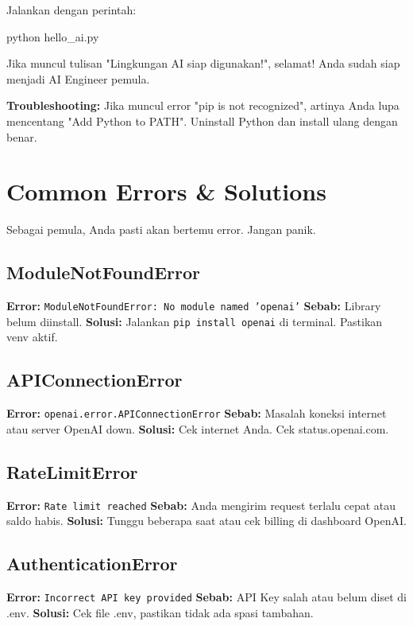 Jalankan dengan perintah:
\begin{codeblock}
python hello_ai.py
\end{codeblock}

Jika muncul tulisan "Lingkungan AI siap digunakan!", selamat! Anda sudah siap menjadi AI Engineer pemula.

\begin{exercisebox}
\textbf{Troubleshooting:}
Jika muncul error "pip is not recognized", artinya Anda lupa mencentang "Add Python to PATH". Uninstall Python dan install ulang dengan benar.
\end{exercisebox}

\section{Common Errors \& Solutions}

Sebagai pemula, Anda pasti akan bertemu error. Jangan panik.

\subsection{ModuleNotFoundError}
\textbf{Error:} \texttt{ModuleNotFoundError: No module named 'openai'}
\textbf{Sebab:} Library belum diinstall.
\textbf{Solusi:} Jalankan \texttt{pip install openai} di terminal. Pastikan venv aktif.

\subsection{APIConnectionError}
\textbf{Error:} \texttt{openai.error.APIConnectionError}
\textbf{Sebab:} Masalah koneksi internet atau server OpenAI down.
\textbf{Solusi:} Cek internet Anda. Cek status.openai.com.

\subsection{RateLimitError}
\textbf{Error:} \texttt{Rate limit reached}
\textbf{Sebab:} Anda mengirim request terlalu cepat atau saldo habis.
\textbf{Solusi:} Tunggu beberapa saat atau cek billing di dashboard OpenAI.

\subsection{AuthenticationError}
\textbf{Error:} \texttt{Incorrect API key provided}
\textbf{Sebab:} API Key salah atau belum diset di .env.
\textbf{Solusi:} Cek file .env, pastikan tidak ada spasi tambahan.
